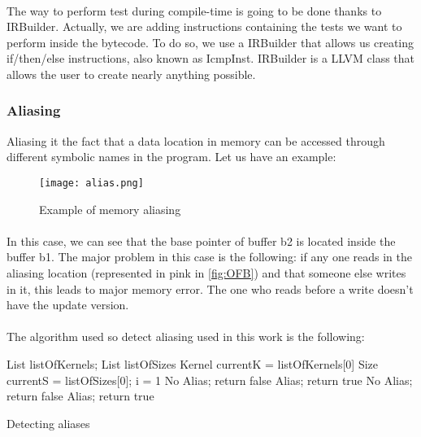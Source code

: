 \documentclass{article}
\begin{document}
\begin{itemize}
\paragraph{}
The way to perform test during compile-time is going to be done thanks to IRBuilder. Actually, we are adding instructions containing the tests we want to perform inside the bytecode. To do so, we use a IRBuilder that allows us creating if/then/else instructions, also known as IcmpInst. IRBuilder is a LLVM class that allows the user to create nearly anything possible. 

\subsubsection{Aliasing}
Aliasing it the fact that a data location in memory can be accessed through different symbolic names in the program. Let us have an example: 
\begin{figure}[h]
	\centering
	\texttt{[image: alias.png]}
	\caption{Example of memory aliasing}
	\label{fig:alias}
\end{figure}

\paragraph{}
In this case, we can see that the base pointer of buffer b2 is located inside the buffer b1. The major problem in this case is the following: if any one reads in the aliasing location (represented in pink in \ref{fig:OFB}) and that someone else writes in it, this leads to major memory error. The one who reads before a write doesn't have the update version. 

\paragraph{}
The algorithm used so detect aliasing used in this work is the following: \\
\begin{algorithm}[H]
\SetAlgoLined
{}
    List listOfKernels; List listOfSizes\;
    Kernel currentK = listOfKernels[0]\;
    Size currentS   = listOfSizes[0];
    i = 1\;
 {
  {
   {
    No Alias;  return false\;
   }
   {
    Alias; return true\;
   }
  }
  {
  {
   {
    No Alias;  return false\;
   }
   {
    Alias; return true\;
   }
  }
  }
 }
 \caption{Detecting aliases}
\end{algorithm}

\end{itemize}
\end{document}
